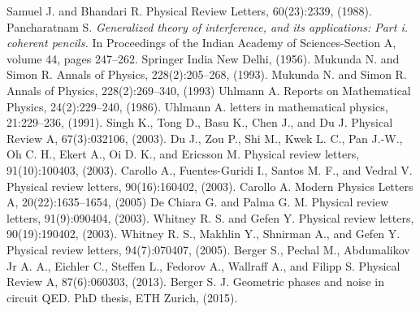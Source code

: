 \begin{thebibliography}{9}
Samuel J. and Bhandari R. Physical Review Letters, 60(23):2339, (1988).
Pancharatnam S. \textit{Generalized theory of interference, and its applications: Part i. coherent pencils.} In Proceedings of the Indian Academy of Sciences-Section A, volume 44, pages 247–262. Springer India New Delhi, (1956).
Mukunda N. and Simon R. Annals of Physics, 228(2):205–268, (1993).
Mukunda N. and Simon R. Annals of Physics, 228(2):269–340, (1993)
Uhlmann A. Reports on Mathematical Physics, 24(2):229–240, (1986).
Uhlmann A. letters in mathematical physics, 21:229–236, (1991).
Singh K., Tong D., Basu K., Chen J., and Du J. Physical Review A, 67(3):032106, (2003).
Du J., Zou P., Shi M., Kwek L. C., Pan J.-W., Oh C. H., Ekert A., Oi D. K., and Ericsson M. Physical review letters, 91(10):100403, (2003).
Carollo A., Fuentes-Guridi I., Santos M. F., and Vedral V. Physical review letters, 90(16):160402, (2003).
Carollo A. Modern Physics Letters A, 20(22):1635–1654, (2005)
De Chiara G. and Palma G. M. Physical review letters, 91(9):090404, (2003).
Whitney R. S. and Gefen Y. Physical review letters, 90(19):190402, (2003).
Whitney R. S., Makhlin Y., Shnirman A., and Gefen Y. Physical review letters, 94(7):070407, (2005).
Berger S., Pechal M., Abdumalikov Jr A. A., Eichler C., Steffen L., Fedorov A., Wallraff A.,
and Filipp S. Physical Review A, 87(6):060303, (2013).
Berger S. J. Geometric phases and noise in circuit QED. PhD thesis, ETH Zurich, (2015).


\end{thebibliography}

